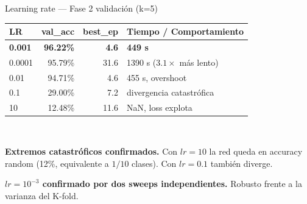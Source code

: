 \documentclass[11pt,aspectratio=169]{beamer}
\begin{document}
\begin{frame}{Learning rate — Fase 2 validación (k=5)}
\centering\small
\begin{tabular}{@{}lrrl@{}}
\toprule
\textbf{LR} & \textbf{val\_acc} & \textbf{best\_ep} & \textbf{Tiempo / Comportamiento} \\
\midrule
\rowcolor{accent2!15}
\textbf{0.001} & \textbf{96.22\%} & \textbf{4.6} & \textbf{449 s} \\
0.0001 & 95.79\% & 31.6 & 1390 s ($3.1\times$ más lento) \\
0.01   & 94.71\% & 4.6  & 455 s, overshoot \\
0.1    & 29.00\% & 7.2  & \textcolor{warn}{divergencia catastrófica} \\
10     & 12.48\% & 11.6 & \textcolor{warn}{NaN, loss explota} \\
\bottomrule
\end{tabular}\\[0.8em]

\begin{warning}
\textbf{Extremos catastróficos confirmados.} Con $lr=10$ la red queda en accuracy random (12\%, equivalente a $1/10$ clases). Con $lr=0.1$ también diverge.
\end{warning}
\vspace{0.4em}

\begin{takeaway}
\textbf{$lr = 10^{-3}$ confirmado por dos sweeps independientes.} Robusto frente a la varianza del K-fold.
\end{takeaway}
\end{frame}
\end{document}
